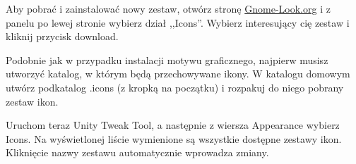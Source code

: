 Aby pobrać i zainstalować nowy zestaw, otwórz stronę \href{http://gnome-look.org/}{Gnome-Look.org} i z panelu po lewej stronie wybierz dział ,,Icons''. Wybierz interesujący cię zestaw i kliknij przycisk \textcolor{ubuntu_orange}{download}.

Podobnie jak w przypadku instalacji motywu graficznego, najpierw musisz utworzyć katalog, w którym będą przechowywane ikony. W katalogu domowym utwórz podkatalog .icons (z kropką na początku) i rozpakuj do niego pobrany zestaw ikon.

Uruchom teraz \textcolor{ubuntu_orange}{Unity Tweak Tool}, a następnie z wiersza \textcolor{ubuntu_orange}{Appearance} wybierz \textcolor{ubuntu_orange}{Icons}. Na wyświetlonej liście wymienione są wszystkie dostępne zestawy ikon. Kliknięcie nazwy zestawu automatycznie wprowadza zmiany.
